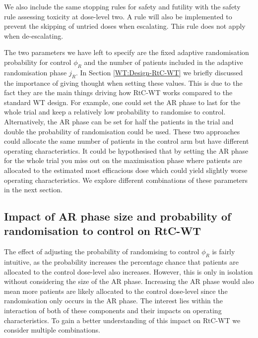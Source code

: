 We also include the same stopping rules for safety and futility with the safety rule assessing toxicity at dose-level two. A rule will also be implemented to prevent the skipping of untried doses when escalating. This rule does not apply when de-escalating. 

The two parameters we have left to specify are the fixed adaptive randomisation probability for control $\phi_R$ and the number of patients included in the adaptive randomisation phase $j_R$. In Section \ref{WT:Design-RtC-WT} we briefly discussed the importance of giving thought when setting these values. This is due to the fact they are the main things driving how RtC-WT works compared to the standard WT design. For example, one could set the AR phase to last for the whole trial and keep a relatively low probability to randomise to control. Alternatively, the AR phase can be set for half the patients in the trial and double the probability of randomisation could be used. These two approaches could allocate the same number of patients in the control arm but have different operating characteristics. It could be hypothesised that by setting the AR phase for the whole trial you miss out on the maximisation phase where patients are allocated to the estimated most efficacious dose which could yield slightly worse operating characteristics. We explore different combinations of these parameters in the next section. 


\subsection{Impact of AR phase size and probability of randomisation to control on RtC-WT}
\label{WT:Impact-ARandRTCon-RtC-WT}


The effect of adjusting the probability of randomising to control $\phi_R$ is fairly intuitive, as the probability increases the percentage chance that patients are allocated to the control dose-level also increases. However, this is only in isolation without considering the size of the AR phase. Increasing the AR phase would also mean more patients are likely allocated to the control dose-level since the randomisation only occurs in the AR phase. The interest lies within the interaction of both of these components and their impacts on operating characteristics. To gain a better understanding of this impact on RtC-WT we consider multiple combinations. 

